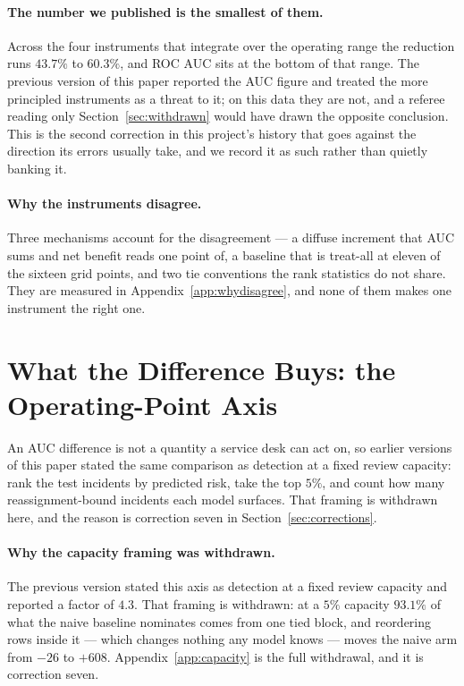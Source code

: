 \documentclass[preprint,12pt]{elsarticle}
\begin{document}
\paragraph{The number we published is the smallest of them.}
Across the four instruments that integrate over the operating range the
reduction runs $43.7\%$ to $60.3\%$, and ROC AUC sits at the bottom of that
range. The previous version of this paper reported the AUC figure and treated
the more principled instruments as a threat to it; on this data they are not,
and a referee reading only Section~\ref{sec:withdrawn} would have drawn the
opposite conclusion. This is the second correction in this project's history
that goes against the direction its errors usually take, and we record it as
such rather than quietly banking it.

\paragraph{Why the instruments disagree.}
Three mechanisms account for the disagreement --- a diffuse increment that AUC sums and net benefit reads one point of, a baseline that is treat-all at eleven of the sixteen grid points, and two tie conventions the rank statistics do not share. They are measured in Appendix~\ref{app:whydisagree}, and none of them makes one instrument the right one.

\section{What the Difference Buys: the Operating-Point Axis}
\label{sec:buys}
\label{sec:opp}

An AUC difference is not a quantity a service desk can act on, so earlier
versions of this paper stated the same comparison as detection at a fixed
review capacity: rank the test incidents by predicted risk, take the top
$5\%$, and count how many reassignment-bound incidents each model surfaces.
That framing is withdrawn here, and the reason is correction seven in
Section~\ref{sec:corrections}.

\paragraph{Why the capacity framing was withdrawn.}
The previous version stated this axis as detection at a fixed review capacity and reported a factor of $4.3$. That framing is withdrawn: at a $5\%$ capacity $93.1\%$ of what the naive baseline nominates comes from one tied block, and reordering rows inside it --- which changes nothing any model knows --- moves the naive arm from $-26$ to $+608$. Appendix~\ref{app:capacity} is the full withdrawal, and it is correction seven.
\end{document}

